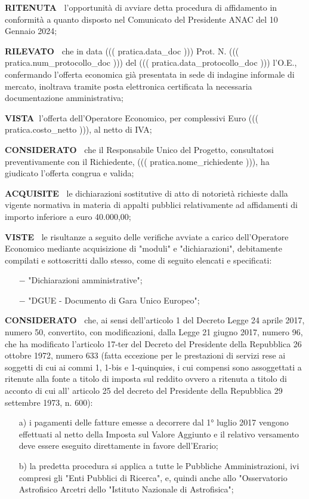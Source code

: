 \documentclass[a4paper,12pt]{letter}
\begin{document}
\textbf{RITENUTA~} l’opportunità di avviare detta
procedura di affidamento in conformità a quanto disposto nel Comunicato
del Presidente ANAC del 10 Gennaio 2024;

\textbf{RILEVATO~} che in data ((( pratica.data_doc )))
Prot. N. ((( pratica.num_protocollo_doc ))) del ((( pratica.data_protocollo_doc )))
l’O.E., confermando l’offerta economica
già presentata in sede di indagine informale di mercato, inoltrava
tramite posta elettronica certificata la necessaria documentazione
amministrativa;

\textbf{VISTA~}l’offerta dell’Operatore
Economico, per complessivi Euro ((( pratica.costo_netto ))), al netto di IVA;

\textbf{CONSIDERATO~} che il Responsabile Unico del
Progetto, consultatosi preventivamente con il 
 Richiedente, ((( pratica.nome_richiedente ))), ha giudicato l’offerta congrua
 e valida;

\textbf{ACQUISITE~}   le dichiarazioni sostitutive
di atto di notorietà richieste dalla vigente normativa in materia di
appalti pubblici relativamente ad affidamenti di importo inferiore a
euro 40.000,00;

\textbf{VISTE~}	le risultanze a seguito delle verifiche avviate a
carico dell’Operatore Economico mediante acquisizione di "moduli" e
"dichiarazioni", debitamente compilati e sottoscritti dallo stesso, come
di seguito elencati e specificati: 

\begin{itemize}
	\item[$-$] "Dichiarazioni amministrative";

	\item[$-$] "DGUE - Documento di Gara Unico Europeo"; 
\end{itemize}

\textbf{CONSIDERATO~} che, ai sensi dell’articolo 1 del
Decreto Legge 24 aprile 2017, numero 50, convertito, con modificazioni,
dalla Legge 21 giugno 2017, numero 96, che ha modificato l’articolo
17-ter del Decreto del Presidente della Repubblica 26 ottobre 1972, numero
633 (fatta eccezione per le prestazioni di servizi rese ai soggetti di
cui ai commi 1, 1-bis e 1-quinquies, i cui compensi sono assoggettati a
ritenute alla fonte a titolo di imposta sul reddito ovvero a ritenuta a
titolo di acconto di cui all' articolo 25 del decreto del Presidente della
Repubblica 29 settembre 1973, n. 600):

\begin{enumerate}

\item[a)] i pagamenti delle fatture
emesse a decorrere dal 1° luglio 2017 vengono effettuati al netto della
Imposta sul Valore Aggiunto e il relativo versamento deve essere eseguito
direttamente in favore dell’Erario;

\item[b)] la predetta procedura si
applica a tutte le Pubbliche Amministrazioni, ivi compresi gli "Enti
Pubblici di Ricerca", e, quindi anche allo "Osservatorio Astrofisico
Arcetri dello "Istituto Nazionale di Astrofisica";
\end{enumerate}
\end{document}
